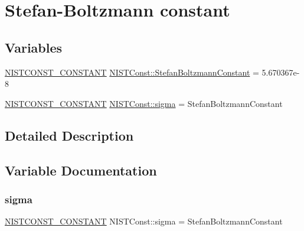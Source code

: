 \hypertarget{group___n_i_s_t_const-_stefan_boltzmann_constant}{}\section{Stefan-\/\+Boltzmann constant}
\label{group___n_i_s_t_const-_stefan_boltzmann_constant}
\subsection*{Variables}
\begin{DoxyCompactItemize}
\item 
\mbox{\hyperlink{group___n_i_s_t_const-_macros_ga2b0fc1d7452373f816175dd86ce26729}{N\+I\+S\+T\+C\+O\+N\+S\+T\+\_\+\+C\+O\+N\+S\+T\+A\+NT}} \mbox{\hyperlink{group___n_i_s_t_const-_stefan_boltzmann_constant_ga7a87fa5e9ed3db503ee24f828d1dc700}{N\+I\+S\+T\+Const\+::\+Stefan\+Boltzmann\+Constant}} = 5.\+670367e-\/8
\item 
\mbox{\hyperlink{group___n_i_s_t_const-_macros_ga2b0fc1d7452373f816175dd86ce26729}{N\+I\+S\+T\+C\+O\+N\+S\+T\+\_\+\+C\+O\+N\+S\+T\+A\+NT}} \mbox{\hyperlink{group___n_i_s_t_const-_stefan_boltzmann_constant_ga2df40d31b99da2cac7f87b0483e3ae37}{N\+I\+S\+T\+Const\+::sigma}} = Stefan\+Boltzmann\+Constant
\end{DoxyCompactItemize}


\subsection{Detailed Description}


\subsection{Variable Documentation}
\mbox{\label{group___n_i_s_t_const-_stefan_boltzmann_constant_ga2df40d31b99da2cac7f87b0483e3ae37}} 
\subsubsection{\texorpdfstring{sigma}{sigma}}
{\footnotesize\ttfamily \mbox{\hyperlink{group___n_i_s_t_const-_macros_ga2b0fc1d7452373f816175dd86ce26729}{N\+I\+S\+T\+C\+O\+N\+S\+T\+\_\+\+C\+O\+N\+S\+T\+A\+NT}} N\+I\+S\+T\+Const\+::sigma = Stefan\+Boltzmann\+Constant}

